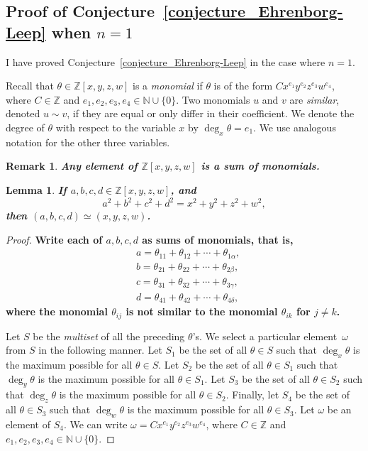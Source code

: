 \documentclass[12pt,table]{article}
\newtheorem{lemma}[theorem]{Lemma}
\newtheorem{remark}[theorem]{Remark}
\numberwithin{equation}{section}
\newcommand{\Nnn}{\mathbb N}
\newcommand{\Zzz}{\mathbb Z}
\begin{document}
\begin{landscape}
{{\section{Proof of Conjecture~\ref{conjecture_Ehrenborg-Leep} when $n=1$}
I have proved Conjecture~\ref{conjecture_Ehrenborg-Leep}
in the case where $n = 1$.


Recall that $ \theta \in \Zzz[x,y,z,w] $ is a \emph{monomial} if $ \theta $
is of the form $Cx^{e_1}y^{e_2}z^{e_3}w^{e_4}$, where $ C \in \Zzz $
and $ e_1,e_2,e_3,e_4 \in \Nnn \cup \{0\} $.
Two monomials $ u$ and $ v $ are \emph{similar}, denoted  $ u \sim v $,
if they are equal or only differ in their
coefficient.
We denote the degree of  $ \theta $ with respect to the variable $x$ 
by  $\deg_x \theta = e_1 $. We use analogous notation for the
other three variables.

\begin{remark}
\bf
Any element of $ \Zzz[x,y,z,w] $ is a sum of monomials.
\end{remark}

\begin{lemma}
\bf
If $a, b, c, d \in \Zzz[x,y,z,w]$, and
\[
a^2 + b^2 + c^2 + d^2 = x^2 + y^2 + z^2 + w^2,
\]
then $ (a, b, c, d ) \simeq (x, y, z, w )$.
\end{lemma}
\begin{proof}
\bf
Write each of $ a,b,c,d $ as sums of monomials, that is, 
\begin{align*}
&a = \theta_{11} + \theta_{12} + \dotsb + \theta_{1\alpha},
\\
&b = \theta_{21} + \theta_{22} + \dotsb + \theta_{2\beta},
\\
&c = \theta_{31} + \theta_{32} + \dotsb + \theta_{3\gamma},
\\
&d = \theta_{41} + \theta_{42} + \dotsb + \theta_{4\delta},
\end{align*}
where the monomial $ \theta_{ij}$ is not similar
to the monomial $\theta_{ik}$ for $ j \neq k$.

Let $S$ be the \emph{multiset} of all the preceding $ \theta $'s.
We select a particular element~$ \omega $
from $S$ in the following manner.
Let $ S_1 $ be the set of all $ \theta \in S  $ such that
$ \deg_x \theta $ is the maximum possible for all $ \theta \in S $.
Let $ S_2 $ be the set of all $ \theta \in S_1  $ such that
$ \deg_y \theta $ is the maximum possible for all $ \theta \in S_1 $.
Let $ S_3 $ be the set of all $ \theta \in S_2  $ such that
$ \deg_z \theta $ is the maximum possible for all $ \theta \in S_2 $.
Finally, let $ S_4 $ be the set of all $ \theta \in S_3  $ such that
$ \deg_w \theta $ is the maximum possible for all $ \theta \in S_3 $.
Let $ \omega $ be an element of $ S_4 $. 
We can write $ \omega = Cx^{e_1}y^{e_2}z^{e_3}w^{e_4}$, where $ C \in \Zzz $
and $ e_1,e_2,e_3,e_4 \in \Nnn \cup \{0\} $.


\end{proof}}}
\end{landscape}
\end{document}
